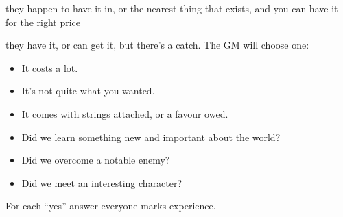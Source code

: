 




{they happen to have it in, or the nearest thing that exists, and you can have it for the right price}
{they have it, or can get it, but there's a catch. The GM will choose one:
\begin{itemize}
\item It costs a lot.
\item It's not quite what you wanted.
\item It comes with strings attached, or a favour owed.
\end{itemize}}


\begin{itemize}
\item Did we learn something new and important about the world?
\item Did we overcome a notable enemy?
\item Did we meet an interesting character?
\end{itemize}

For each ``yes'' answer everyone marks experience.

